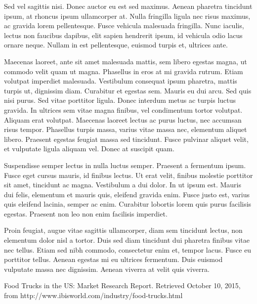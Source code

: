 \documentclass[12pt, letterpaper]{article}
\begin{document}
Sed vel sagittis nisi. Donec auctor eu est sed maximus. Aenean pharetra tincidunt ipsum, at rhoncus ipsum ullamcorper at. Nulla fringilla ligula nec risus maximus, ac gravida lorem pellentesque. Fusce vehicula malesuada fringilla. Nunc iaculis, lectus non faucibus dapibus, elit sapien hendrerit ipsum, id vehicula odio lacus ornare neque. Nullam in est pellentesque, euismod turpis et, ultrices ante.

Maecenas laoreet, ante sit amet malesuada mattis, sem libero egestas magna, ut commodo velit quam ut magna. Phasellus in eros at mi gravida rutrum. Etiam volutpat imperdiet malesuada. Vestibulum consequat ipsum pharetra, mattis turpis ut, dignissim diam. Curabitur et egestas sem. Mauris eu dui arcu. Sed quis nisi purus. Sed vitae porttitor ligula. Donec interdum metus ac turpis luctus gravida. In ultrices sem vitae magna finibus, vel condimentum tortor volutpat. Aliquam erat volutpat. Maecenas laoreet lectus ac purus luctus, nec accumsan risus tempor. Phasellus turpis massa, varius vitae massa nec, elementum aliquet libero. Praesent egestas feugiat massa sed tincidunt. Fusce pulvinar aliquet velit, et vulputate ligula aliquam vel. Donec at suscipit quam.

Suspendisse semper lectus in nulla luctus semper. Praesent a fermentum ipsum. Fusce eget cursus mauris, id finibus lectus. Ut erat velit, finibus molestie porttitor sit amet, tincidunt ac magna. Vestibulum a dui dolor. In ut ipsum est. Mauris dui felis, elementum et mauris quis, eleifend gravida enim. Fusce justo est, varius quis eleifend lacinia, semper ac enim. Curabitur lobortis lorem quis purus facilisis egestas. Praesent non leo non enim facilisis imperdiet.

Proin feugiat, augue vitae sagittis ullamcorper, diam sem tincidunt lectus, non elementum dolor nisl a tortor. Duis sed diam tincidunt dui pharetra finibus vitae nec tellus. Etiam sed nibh commodo, consectetur enim et, tempor lacus. Fusce eu porttitor tellus. Aenean egestas mi eu ultrices fermentum. Duis euismod vulputate massa nec dignissim. Aenean viverra at velit quis viverra.

\newpage

\begin{thebibliography}{9}

        Food Trucks in the US: Market Research Report. Retrieved October 10, 2015, from http://www.ibisworld.com/industry/food-trucks.html


\end{thebibliography}

\newpage

\end{document}
